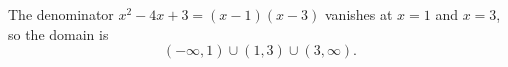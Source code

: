 The denominator $x^2-4x+3=(x-1)(x-3)$ vanishes at $x=1$ and $x=3$, so the domain is
\[\boxed{(-\infty,1)\cup(1,3)\cup(3,\infty)}.\]
